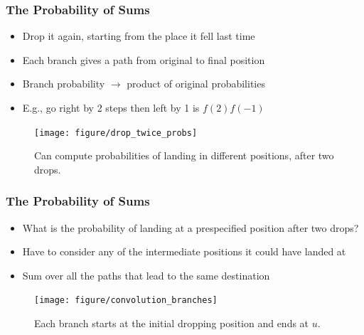 \documentclass[10pt,mathserif]{beamer}
\begin{document}
\begin{frame}
  \frametitle{The Probability of Sums}
  \begin{itemize}
    \item Drop it again, starting from the place it fell last time
    \item Each branch gives a path from original to final position
    \item Branch probability $\rightarrow$ product of original probabilities
    \item E.g., go right by 2 steps then left by 1 is $f\left(2\right)f\left(-1\right)$
  \end{itemize}
  \begin{figure}[ht]
    \centering
    \texttt{[image: figure/drop\_twice\_probs]}
    \caption{Can compute probabilities of landing in different positions, after
      two drops.
       \label{fig:drop_twice_probs}}
  \end{figure}
\end{frame}

\begin{frame}
  \frametitle{The Probability of Sums}
  \begin{itemize}
    \item What is the probability of landing at a prespecified position after
      two drops?
    \item Have to consider any of the intermediate positions it could have
      landed at
    \item Sum over all the paths that lead to the same destination
  \end{itemize}
  \begin{figure}[ht]
    \centering
    \texttt{[image: figure/convolution\_branches]}
    \caption{Each branch starts at the initial dropping position and ends at
      $u$. \label{fig:convolution_branches} }
  \end{figure}
\end{frame}
\end{document}
